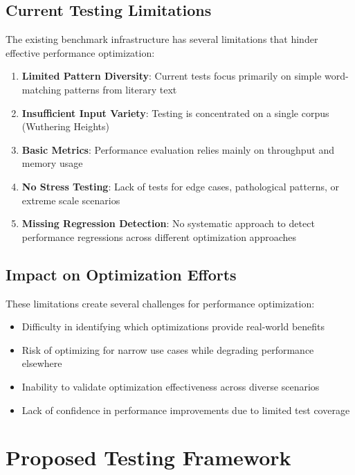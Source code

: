 \documentclass[11pt,a4paper]{article}
\begin{document}
\subsection{Current Testing Limitations}

The existing benchmark infrastructure has several limitations that hinder effective performance optimization:

\begin{enumerate}
    \item \textbf{Limited Pattern Diversity}: Current tests focus primarily on simple word-matching patterns from literary text
    \item \textbf{Insufficient Input Variety}: Testing is concentrated on a single corpus (Wuthering Heights)
    \item \textbf{Basic Metrics}: Performance evaluation relies mainly on throughput and memory usage
    \item \textbf{No Stress Testing}: Lack of tests for edge cases, pathological patterns, or extreme scale scenarios
    \item \textbf{Missing Regression Detection}: No systematic approach to detect performance regressions across different optimization approaches
\end{enumerate}

\subsection{Impact on Optimization Efforts}

These limitations create several challenges for performance optimization:

\begin{itemize}
    \item Difficulty in identifying which optimizations provide real-world benefits
    \item Risk of optimizing for narrow use cases while degrading performance elsewhere
    \item Inability to validate optimization effectiveness across diverse scenarios
    \item Lack of confidence in performance improvements due to limited test coverage
\end{itemize}

\section{Proposed Testing Framework}
\end{document}
